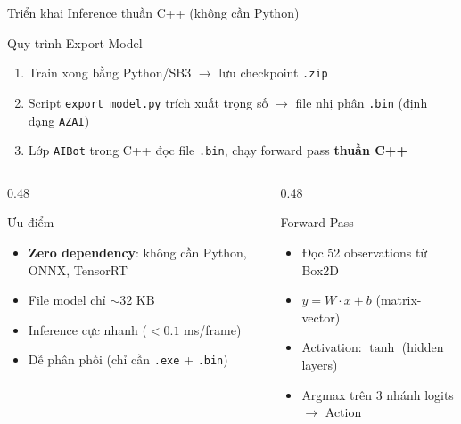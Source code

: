 \documentclass[aspectratio=169, 11pt]{beamer}
\begin{document}
\begin{frame}{Triển khai Inference thuần C++ (không cần Python)}
  \begin{block}{Quy trình Export Model}
    \begin{enumerate}
      \item Train xong bằng Python/SB3 $\rightarrow$ lưu checkpoint \texttt{.zip}
      \item Script \texttt{export\_model.py} trích xuất trọng số $\rightarrow$ file nhị phân \texttt{.bin} (định dạng \texttt{AZAI})
      \item Lớp \texttt{AIBot} trong C++ đọc file \texttt{.bin}, chạy forward pass \textbf{thuần C++}
    \end{enumerate}
  \end{block}

  \vspace{4pt}
  \begin{columns}[T]
    \begin{column}{0.48\textwidth}
      \begin{exampleblock}{Ưu điểm}
        \begin{itemize}
          \item \textbf{Zero dependency}: không cần Python, ONNX, TensorRT
          \item File model chỉ $\sim$32 KB
          \item Inference cực nhanh ($<0.1$ ms/frame)
          \item Dễ phân phối (chỉ cần \texttt{.exe} + \texttt{.bin})
        \end{itemize}
      \end{exampleblock}
    \end{column}
    \begin{column}{0.48\textwidth}
      \begin{alertblock}{Forward Pass}
        \begin{itemize}
          \item Đọc 52 observations từ Box2D
          \item $y = W \cdot x + b$ (matrix-vector)
          \item Activation: $\tanh$ (hidden layers)
          \item Argmax trên 3 nhánh logits $\rightarrow$ Action
        \end{itemize}
      \end{alertblock}
    \end{column}
  \end{columns}
\end{frame}
\end{document}
